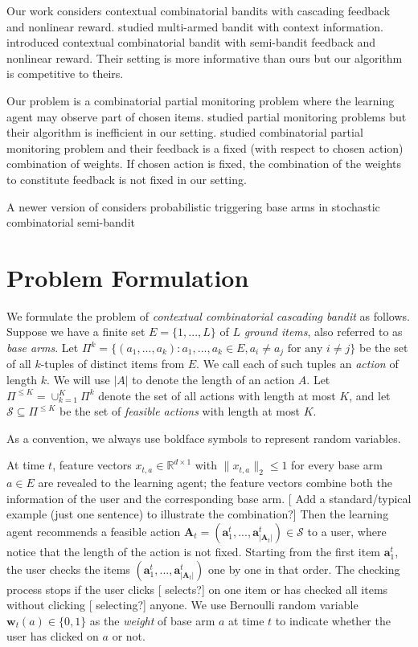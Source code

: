 \documentclass{article}
\newcommand{\RR}{\mathbb{R}}
\newcommand{\bA}{\mathbf{A}}
\newcommand{\ba}{\mathbf{a}}
\newcommand{\bw}{\mathbf{w}}
\newcommand{\cS}{\mathcal{S}}
\newcommand{\abs}[1]{\left| #1 \right|}
\newcommand{\norm}[1]{\| #1 \|}
\newcommand{\shengyu}[1]{{\color{green!50!black} [\text{Shengyu:} #1]}}
\begin{document}
Our work considers contextual combinatorial bandits with cascading feedback and nonlinear reward. \cite{li2010contextual} studied multi-armed bandit with context information. \cite{qin2014contextual} introduced contextual combinatorial bandit with semi-bandit feedback and nonlinear reward. Their setting is more informative than ours but our algorithm is competitive to theirs.

Our problem is a combinatorial partial monitoring problem where the learning agent may observe part of chosen items. \cite{agrawal1989asymptotically,bartok2012adaptive} studied partial monitoring problems but their algorithm is inefficient in our setting. \cite{lin2014combinatorial} studied combinatorial partial monitoring problem and their feedback is a fixed (with respect to chosen action) combination of weights. If chosen action is fixed, the combination of the weights to constitute feedback is not fixed in our setting.

A newer version of \cite{chen2013combinatorial} considers probabilistic triggering base arms in stochastic combinatorial semi-bandit
	
\section{Problem Formulation}

We formulate the problem of {\em contextual combinatorial cascading bandit} as follows. 
Suppose we have a finite set  $E=\{1,...,L\}$ of $L$ \textit{ground items},  also referred to as {\em base arms}. 
Let $\Pi^k=\{(a_1,...,a_k): a_1,...,a_k \in E, a_i \neq a_j \text{ for any } i \neq j\}$ be the set of all $k$-tuples of distinct items from $E$. 
We call each of such tuples an {\em action} of length $k$. We will use $|A|$ to denote the length of an action $A$.
Let $\Pi^{\leq K}= \cup_{k=1}^K \Pi^{k}$ denote the set of all actions with length at most $K$, and let $\cS \subseteq \Pi^{\leq K}$ be the set of \textit{feasible actions} with length at most $K$. 

As a convention, we always use boldface symbols to represent random variables.

At time $t$, feature vectors $x_{t,a} \in \RR^{d \times 1}$ with $\norm{x_{t,a}}_2 \leq 1$ for every base arm $a \in E$ are revealed to the learning agent; the feature vectors combine both the information of the user and the corresponding base arm. \shengyu{Add a standard/typical example (just one sentence) to illustrate the combination?} Then the learning agent recommends a feasible action $\bA_t=(\ba_{1}^t,...,\ba_{\abs{\bA_t}}^t) \in \cS$ to a user, where notice that the length of the action is not fixed. Starting from the first item $\ba_{1}^t$, the user checks the items $(\ba_{1}^t,...,\ba_{\abs{\bA_t}}^t)$ one by one in that order. The checking process stops if the user clicks \shengyu{selects?} on one item or has checked all items without clicking \shengyu{selecting?} anyone. We use Bernoulli random variable $\bw_{t}(a) \in \{0,1\}$ as the {\em weight} of base arm $a$ at time $t$ to indicate whether the user has clicked on $a$ or not. 
\end{document}
